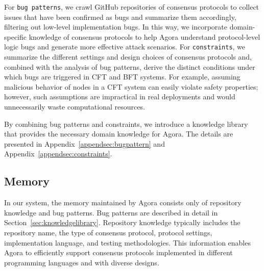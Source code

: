 \documentclass{article}
\theoremstyle{plain}
\theoremstyle{definition}
\theoremstyle{remark}
\newcommand{\consensustester}{Agora\xspace}
\begin{document}

For \texttt{bug patterns}, we crawl GitHub repositories of consensus protocols to collect issues that have been confirmed as bugs and summarize them accordingly, filtering out low-level implementation bugs. In this way, we incorporate domain-specific knowledge of consensus protocols to help \consensustester understand protocol-level logic bugs and generate more effective attack scenarios.
For \texttt{constraints}, we summarize the different settings and design choices of consensus protocols and, combined with the analysis of bug patterns, derive the distinct conditions under which bugs are triggered in CFT and BFT systems. For example, assuming malicious behavior of nodes in a CFT system can easily violate safety properties; however, such assumptions are impractical in real deployments and would unnecessarily waste computational resources.

By combining bug patterns and constraints, we introduce a knowledge library that provides the necessary domain knowledge for \consensustester. The details are presented in Appendix~\ref{appendsec:bugpattern} and Appendix~\ref{appendsec:constraints}.

\subsection{Memory}
\label{sec:memory}

In our system, the memory maintained by \consensustester consists only of repository knowledge and bug patterns. Bug patterns are described in detail in Section~\ref{sec:knowledgelibrary}. Repository knowledge typically includes the repository name, the type of consensus protocol, protocol settings, implementation language, and testing methodologies. This information enables \consensustester to efficiently support consensus protocols implemented in different programming languages and with diverse designs.
\end{document}

